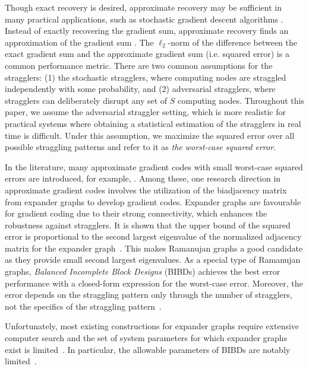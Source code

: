 \documentclass[lettersize,journal]{IEEEtran}
\begin{document}
Though exact recovery is desired, approximate recovery may be sufficient in many practical applications, such as stochastic gradient descent algorithms \cite{mania2017perturbed}. Instead of exactly recovering the gradient sum, approximate recovery finds an approximation of the gradient sum \cite{approx-gc}. The 
$\ell_2$-norm of the difference between the exact gradient sum and the approximate gradient sum (i.e. squared error) is a common performance metric. There are two common assumptions for the stragglers: (1) the stochastic stragglers, where computing nodes are straggled independently with some probability, and (2) adversarial stragglers, where stragglers can deliberately disrupt any set of $S$ computing nodes. Throughout this paper, we assume the adversarial straggler setting, which is more realistic for practical systems where obtaining a statistical estimation of the stragglers in real time is difficult. Under this assumption, we maximize the squared error over all possible straggling patterns and refer to it as \textit{the worst-case squared error}.

In the literature, many approximate gradient codes with small worst-case squared errors are introduced, for example, \cite{aktas2017effective, expander-GC, approx-gc, bibd, soft-bibd}.
Among these, one research direction in approximate gradient codes involves the utilization of the biadjacency matrix from expander graphs to develop gradient codes\cite{expander-GC}. Expander graphs are favourable for gradient coding due to their strong connectivity, which enhances the robustness against stragglers. It is shown that the upper bound of the squared error is proportional to the second largest eigenvalue of the normalized adjacency matrix for the expander graph~\cite{expander-GC}. This makes Ramanujan graphs a good candidate as they provide small second largest eigenvalues. As a special type of Ramanujan graphs, \textit{Balanced Incomplete Block Designs} (BIBDs) achieves the best error performance with a closed-form expression for the worst-case error. Moreover, the error depends on the straggling pattern only through the number of stragglers, not the specifics of the straggling pattern~\cite{bibd}.

Unfortunately, most existing constructions for expander graphs require extensive computer search \cite{marcus2013interlacing} and the set of system parameters for which expander graphs exist is limited~\cite{expander-limits}. In particular, the allowable parameters of BIBDs are notably limited~\cite{bibd-para}. 
\end{document}
